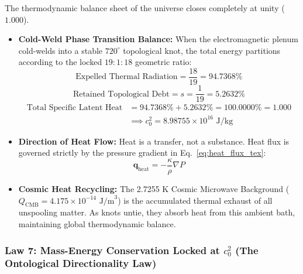 \documentclass[11pt,a4paper]{article}
\begin{document}
The thermodynamic balance sheet of the universe closes completely at unity ($1.000$).
\begin{itemize}
    \item \textbf{Cold-Weld Phase Transition Balance:} When the electromagnetic plenum cold-welds into a stable $720^\circ$ topological knot, the total energy partitions according to the locked $19:1:18$ geometric ratio:
    \begin{equation}
    \text{Expelled Thermal Radiation} = \frac{18}{19} = 94.7368\%
    \end{equation}
    \begin{equation}
    \text{Retained Topological Debt} = s = \frac{1}{19} = 5.2632\%
    \end{equation}
    \begin{equation}
    \begin{aligned}
    \text{Total Specific Latent Heat} &= 94.7368\% + 5.2632\% = 100.0000\% = 1.000 \\
    &\implies c_0^2 = 8.98755 \times 10^{16}\text{ J/kg}
    \end{aligned}
    \end{equation}
    \item \textbf{Direction of Heat Flow:} Heat is a transfer, not a substance. Heat flux is governed strictly by the pressure gradient in Eq.~\eqref{eq:heat_flux_tex}:
    \begin{equation}
    \mathbf{q}_{\text{heat}} = -\frac{\kappa}{\rho}\nabla P
    \label{eq:heat_flux_tex}
    \end{equation}
    \item \textbf{Cosmic Heat Recycling:} The 2.7255 K Cosmic Microwave Background ($Q_{\text{CMB}} = 4.175 \times 10^{-14}\text{ J/m}^3$) is the accumulated thermal exhaust of all unspooling matter. As knots untie, they absorb heat from this ambient bath, maintaining global thermodynamic balance.
\end{itemize}

\subsubsection{Law 7: Mass-Energy Conservation Locked at $c_0^2$ (The Ontological Directionality Law)}
\label{subsubsec:law_7_mass_energy_direction}
\end{document}
